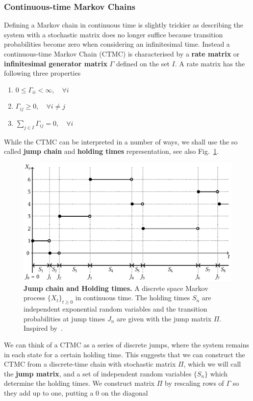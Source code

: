 \subsubsection{Continuous-time Markov Chains}
\label{subsubsect:CTMC}
Defining a Markov chain in continuous time is slightly trickier as describing the system with a stochastic matrix does no longer suffice because transition probabilities become zero when considering an infinitesimal time. Instead a continuous-time Markov Chain (CTMC) is characterised by a \textbf{rate matrix} or \textbf{infinitesimal generator matrix} $\Gamma$ defined on the set $I$. A rate matrix has the following three properties
\begin{enumerate}[label=\roman*)]
	\item $0 \leq \Gamma_{ii} <\infty, \quad \forall i$
	\item $\Gamma_{ij} \geq 0, \quad \forall i \neq j$
	\item $\sum_{j \in I} \Gamma_{i j}=0, \quad \forall i$
\end{enumerate}
While the CTMC can be interpreted in a number of ways, we shall use the so called \textbf{jump chain} and \textbf{holding times} representation, see also Fig.~\ref{fig:holdingJumping}. 
\begin{figure}[h]
	\centering
	\includegraphics[width=0.9\linewidth]{Diagrams/ctmc/ctmc}
	\caption[Jump chain and Holding times]{\textbf{Jump chain and Holding times.} A discrete space Markov process $\{X_t\}_{t\geq 0}$ in continuous time. The holding times $S_n$ are independent exponential random variables and the transition probabilities at jump times $J_n$ are given with the jump matrix $\Pi$. Inspired by~\cite{norris1998markov}.}
	\label{fig:holdingJumping}
\end{figure}
We can think of a CTMC as a series of discrete jumps, where the system remains in each state for a certain holding time. This suggests that we can construct the CTMC from a discrete-time chain with stochastic matrix $\Pi$, which we will call the \textbf{jump matrix}, and a set of independent random variables $\{S_n\}$ which determine the holding times. We construct matrix $\Pi$ by rescaling rows of $\Gamma$ so they add up to one, putting a $0$ on the diagonal
